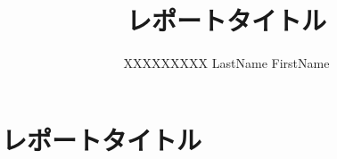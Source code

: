 \documentclass[12pt,a4paper]{jarticle}
\title{レポートタイトル}
\author{XXXXXXXXX LastName FirstName}
\begin{document}

\section*{レポートタイトル}
\end{document}
